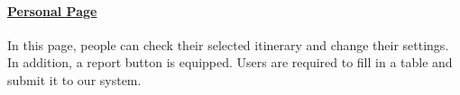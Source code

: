 \documentclass[10pt]{article}
\begin{document}
\paragraph{\underline{Personal Page}}
In this page, people can check their selected itinerary and change their settings. In addition, a report button is equipped. Users are required to fill in a table and submit it to our system.
\end{document}
